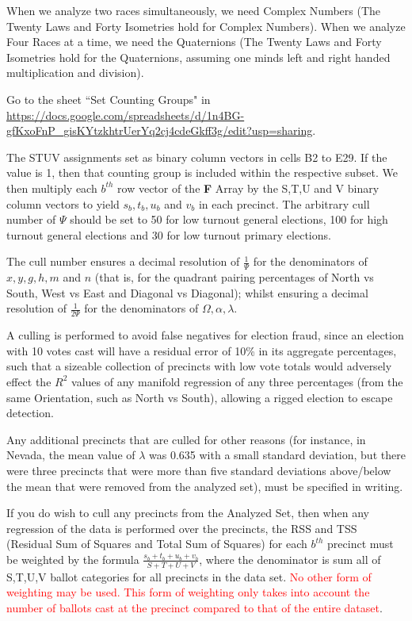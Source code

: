 When we analyze two races simultaneously, we need Complex Numbers (The Twenty Laws and Forty Isometries hold for Complex Numbers). When we analyze Four Races at a time, we need the Quaternions (The Twenty Laws and Forty Isometries hold for the Quaternions, assuming one minds left and right handed multiplication and division).

Go to the sheet ``Set Counting Groups" in \url{https://docs.google.com/spreadsheets/d/1n4BG-gfKxoFnP_gisKYtzkhtrUerYq2cj4cdeGkff3g/edit?usp=sharing}.

The STUV assignments set as binary column vectors in cells B2 to E29. If the value is 1, then that counting group is included within the respective subset. We then multiply each $b^{th}$ row vector of the \textbf{F} Array by the S,T,U and V binary column vectors to yield $s_{b}, t_{b}, u_{b}$ and $v_{b}$ in each precinct.
\newpage
The arbitrary cull number of $\Psi$ should be set to 50 for low turnout general elections, 100 for high turnout general elections and 30 for low turnout primary elections.

The cull number ensures a decimal resolution of $\frac{1}{\Psi}$ for the denominators of $x,y,g,h,m$ and $n$ (that is, for the quadrant pairing percentages of North vs South, West vs East and Diagonal vs Diagonal); whilst ensuring a decimal resolution of $\frac{1}{2\Psi}$ for the denominators of $\Omega,\alpha,\lambda$. 

A culling is performed to avoid false negatives for election fraud, since an election with 10 votes cast will have a residual error of 10\% in its aggregate percentages, such that a sizeable collection of precincts with low vote totals would adversely effect the $R^2$ values of any manifold regression of any three percentages (from the same Orientation, such as North vs South), allowing a rigged election to escape detection. 

Any additional precincts that are culled for other reasons (for instance, in Nevada, the mean value of $\lambda$ was 0.635 with a small standard deviation, but there were three precincts that were more than five standard deviations above/below the mean that were removed from the analyzed set), must be specified in writing.

If you do wish to cull any precincts from the Analyzed Set, then when any regression of the data is performed over the precincts, the RSS and TSS (Residual Sum of Squares and Total Sum of Squares) for each $b^{th}$ precinct must be weighted by the formula $\frac{s_{b}+t_{b}+u_{b}+v_{b}}{S+T+U+V}$, where the denominator is sum all of S,T,U,V ballot categories for all precincts in the data set. \textcolor{red}{No other form of weighting may be used. This form of weighting only takes into account the number of ballots cast at the precinct compared to that of the entire dataset}.

